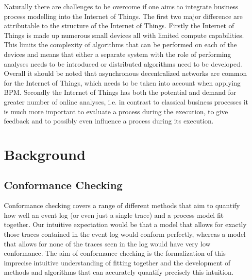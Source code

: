\documentclass[runningheads]{template/llncs}
\begin{document}
Naturally there are challenges to be overcome if one aims to integrate business process modelling into the Internet of Things.
The first two major difference are attributable to the structure of the Internet of Things.
Firstly the Internet of Things is made up numerous small devices all with limited compute capabilities.
This limits the complexity of algorithms that can be performed on each of the devices and means that either a separate system with the role of performing analyses needs to be introduced or distributed algorithms need to be developed.
Overall it should be noted that asynchronous decentralized networks are common for the Internet of Things, which needs to be taken into account when applying BPM.
Secondly the Internet of Things has both the potential and demand for greater number of online analyses, i.e. in contrast to classical business processes it is much more important to evaluate a process during the execution, to give feedback and to possibly even influence a process during its execution.

\section{Background}
\subsection{Conformance Checking}
Conformance checking covers a range of different methods that aim to quantify how well an event log (or even just a single trace) and a process model fit together.
Our intuitive expectation would be that a model that allows for exactly those traces contained in the event log would conform perfectly, whereas a model that allows for none of the traces seen in the log would have very low conformance.
The aim of conformance checking is the formalization of this imprecise intuitive understanding of fitting together and the development of methods and algorithms that can accurately quantify precisely this intuition.
\end{document}
